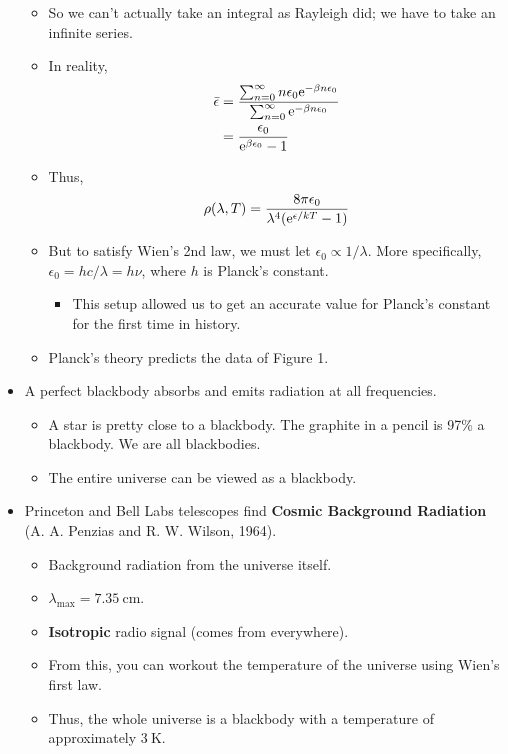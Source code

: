 \documentclass[../notes.tex]{subfiles}
\begin{document}
\begin{itemize}
\begin{itemize}
        \item So we can't actually take an integral as Rayleigh did; we have to take an infinite series.
        \item In reality,
        \begin{align*}
            \bar{\epsilon} &= \frac{\sum_{n=0}^\infty n\epsilon_0\e[-\beta n\epsilon_0]}{\sum_{n=0}^\infty\e[-\beta n\epsilon_0]}\\
            &= \frac{\epsilon_0}{\e[\beta\epsilon_0]-1}
        \end{align*}
        \item Thus,
        \begin{equation*}
            \rho(\lambda,T) = \frac{8\pi\epsilon_0}{\lambda^4(\e[\epsilon/kT]-1)}
        \end{equation*}
        \item But to satisfy Wien's 2nd law, we must let $\epsilon_0\propto 1/\lambda$. More specifically, $\epsilon_0=hc/\lambda=h\nu$, where $h$ is Planck's constant.
        \begin{itemize}
            \item This setup allowed us to get an accurate value for Planck's constant for the first time in history.
        \end{itemize}
        \item Planck's theory predicts the data of Figure 1.
    \end{itemize}
    \item A perfect blackbody absorbs and emits radiation at all frequencies.
    \begin{itemize}
        \item A star is pretty close to a blackbody. The graphite in a pencil is 97\% a blackbody. We are all blackbodies.
        \item The entire universe can be viewed as a blackbody.
    \end{itemize}
    \item Princeton and Bell Labs telescopes find \textbf{Cosmic Background Radiation} (A. A. Penzias and R. W. Wilson, 1964).
    \begin{itemize}
        \item Background radiation from the universe itself.
        \item $\lambda_\text{max}=\SI{7.35}{\centi\meter}$.
        \item \textbf{Isotropic} radio signal (comes from everywhere).
        \item From this, you can workout the temperature of the universe using Wien's first law.
        \item Thus, the whole universe is a blackbody with a temperature of approximately $\SI{3}{\kelvin}$.
    \end{itemize}
\end{itemize}
\end{document}
